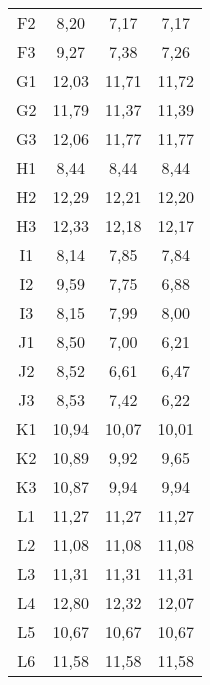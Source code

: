 \begin{center}
\begin{longtable}{cccc}
    F2    & 8,20  & 7,17  & 7,17 \\
    F3    & 9,27  & 7,38  & 7,26 \\
    G1    & 12,03 & 11,71 & 11,72 \\
    G2    & 11,79 & 11,37 & 11,39 \\
    G3    & 12,06 & 11,77 & 11,77 \\
    H1    & 8,44  & 8,44  & 8,44 \\
    H2    & 12,29 & 12,21 & 12,20 \\
    H3    & 12,33 & 12,18 & 12,17 \\
    I1    & 8,14  & 7,85  & 7,84 \\
    I2    & 9,59  & 7,75  & 6,88 \\
    I3    & 8,15  & 7,99  & 8,00 \\
    J1    & 8,50  & 7,00  & 6,21 \\
    J2    & 8,52  & 6,61  & 6,47 \\
    J3    & 8,53  & 7,42  & 6,22 \\
    K1    & 10,94 & 10,07 & 10,01 \\
    K2    & 10,89 & 9,92  & 9,65 \\
    K3    & 10,87 & 9,94  & 9,94 \\
    L1    & 11,27 & 11,27 & 11,27 \\
    L2    & 11,08 & 11,08 & 11,08 \\
    L3    & 11,31 & 11,31 & 11,31 \\
    L4    & 12,80 & 12,32 & 12,07 \\
    L5    & 10,67 & 10,67 & 10,67 \\
    L6    & 11,58 & 11,58 & 11,58 \\


\end{longtable}
\end{center}

